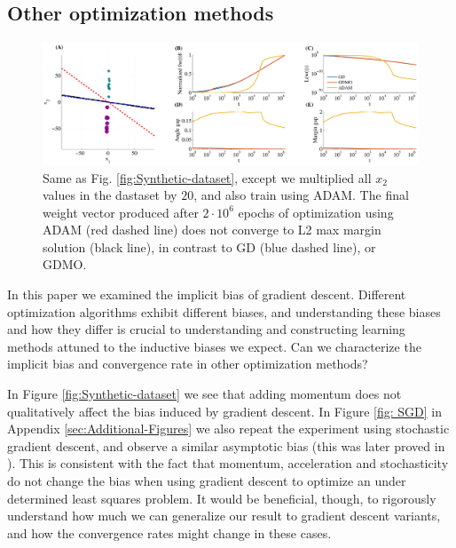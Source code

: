 \documentclass[twoside,11pt,english]{article}
\begin{document}
\subsection{Other optimization methods \label{sec:other_opt}}

\begin{figure}
\begin{centering}
\includegraphics[width=1\columnwidth]{Plots/ToyDataset_adam} 
\par\end{centering}
\caption{Same as Fig. \ref{fig:Synthetic-dataset}, except we multiplied all
$x_{2}$ values in the dastaset by $20$, and also train using ADAM.
The final weight vector produced after $2\cdot10^{6}$ epochs of optimization
using ADAM (red dashed line) does not converge to L2 max margin solution
(black line), in contrast to GD (blue dashed line), or GDMO.\label{fig:Synthetic-dataset-adam}}
\end{figure}

In this paper we examined the implicit bias of gradient descent. Different
optimization algorithms exhibit different biases, and understanding
these biases and how they differ is crucial to understanding and constructing
learning methods attuned to the inductive biases we expect. Can we
characterize the implicit bias and convergence rate in other optimization
methods?

In Figure \ref{fig:Synthetic-dataset} we see that adding momentum
does not qualitatively affect the bias induced by gradient descent.
In Figure \ref{fig: SGD} in Appendix \ref{sec:Additional-Figures}
we also repeat the experiment using stochastic gradient descent, and
observe a similar asymptotic bias (this was later proved in \citet{Nacson2018b}). This is consistent with the fact that momentum,
acceleration and stochasticity do not change the bias when using gradient
descent to optimize an under determined least squares problem. It
would be beneficial, though, to rigorously understand how much we
can generalize our result to gradient descent variants, and how the
convergence rates might change in these cases.
\end{document}
